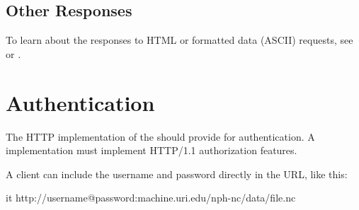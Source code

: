 \documentclass[justify]{dods-paper}
\begin{document}
\subsection{Other Responses}

To learn about the responses to HTML or formatted data (ASCII)
requests, see \DAPHTML or \DAPASCII. 


\section{Authentication}


The HTTP implementation of the \DAP should provide for authentication.
A \DAP implementation must implement HTTP/1.1 authorization features.

A client can include the username and password directly in the \DAP
URL, like this:

\begin{vcode}{it}
http://username@password:machine.uri.edu/nph-nc/data/file.nc  
\end{vcode}



\appendix


\T{}
\T\raggedright

\end{document}
